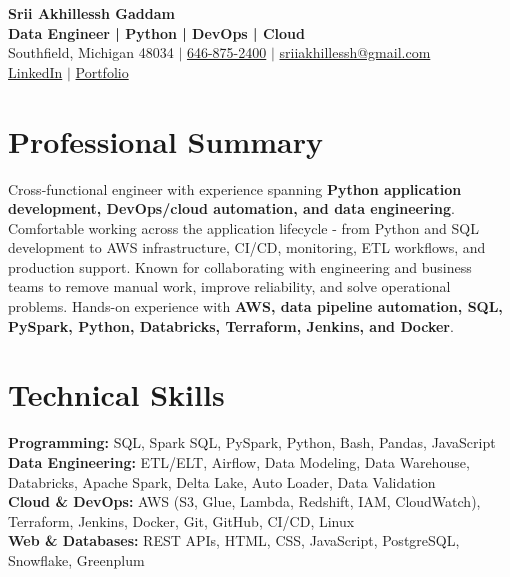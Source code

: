 \documentclass[letterpaper,10pt]{article}
\begin{document}
\fontsize{9.35pt}{10.45pt}\selectfont

\begin{center}
    {\LARGE \textbf{Srii Akhillessh Gaddam}} \\[-1pt]
    \textbf{Data Engineer | Python | DevOps | Cloud} \\[2pt]
    Southfield, Michigan 48034 $|$
    \href{tel:6468752400}{646-875-2400} $|$
    \href{mailto:sriiakhillessh@gmail.com}{sriiakhillessh@gmail.com} \\[1pt]
    \href{https://www.linkedin.com/in/srii-akhiilessh-gaddam-b48668191/}{LinkedIn} $|$
    \href{https://sriiakhillesshg.github.io/portfolio/}{Portfolio}
\end{center}
\vspace{-8pt}

\section{Professional Summary}
\small{Cross-functional engineer with experience spanning \textbf{Python application development, DevOps/cloud automation, and data engineering}. Comfortable working across the application lifecycle - from Python and SQL development to AWS infrastructure, CI/CD, monitoring, ETL workflows, and production support. Known for collaborating with engineering and business teams to remove manual work, improve reliability, and solve operational problems. Hands-on experience with \textbf{AWS, data pipeline automation, SQL, PySpark, Python, Databricks, Terraform, Jenkins, and Docker}.}

\section{Technical Skills}
\small{
\textbf{Programming:} SQL, Spark SQL, PySpark, Python, Bash, Pandas, JavaScript \\
\textbf{Data Engineering:} ETL/ELT, Airflow, Data Modeling, Data Warehouse, Databricks, Apache Spark, Delta Lake, Auto Loader, Data Validation \\
\textbf{Cloud \& DevOps:} AWS (S3, Glue, Lambda, Redshift, IAM, CloudWatch), Terraform, Jenkins, Docker, Git, GitHub, CI/CD, Linux \\
\textbf{Web \& Databases:} REST APIs, HTML, CSS, JavaScript, PostgreSQL, Snowflake, Greenplum
}
\end{document}
